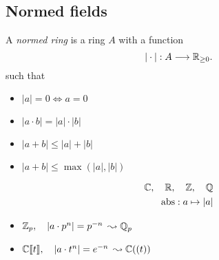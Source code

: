 \subsection{Normed fields} \label{sec:normed_fields}

\begin{frame}[fragile]
	\begin{minipage}[t]{.60\textwidth}
	\begin{definition}
		A \emph{normed ring} is a ring  $A$ with a function \[ 
			|\cdot |:A  \longrightarrow \mathbb R_{\ge 0}
		.\]
	such that 
	\begin{itemize}
		\item $|a| = 0 \iff a= 0$
		\item $|a \cdot b| = |a | \cdot |b|$ 
		\item $|a + b| \le |a| + |b|$
	\end{itemize}

	\medskip

	\begin{itemize}
		\item<2-> $|a + b| \le \max(|a|, |b|)$
\end{itemize}
	\end{definition}
	\end{minipage}
	\;\;
	\begin{minipage}[t]{.35\textwidth}
		\begin{examples}
			\[
				\begin{aligned}
			\mathbb C,\quad \mathbb R,\quad \mathbb Z,\quad \mathbb Q\\
			\mathrm{abs}:a \mapsto |a|
				\end{aligned}
		\]

		\bigskip

		\begin{itemize}
				\item<2-> $\mathbb Z_p,\quad |a\cdot p^{n}| = p^{-n}$ $\leadsto \mathbb Q_p$
				\item<2-> $\mathbb C\llbracket t \rrbracket,\quad |a\cdot t ^{n}| = e^{-n}$ $\leadsto \mathbb C((t))$
		\end{itemize}	
	\end{examples}
	\end{minipage}
\end{frame}
